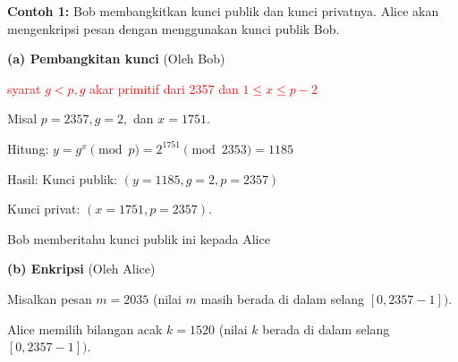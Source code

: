 \documentclass{article}
\begin{document}

\textbf{Contoh 1:} Bob membangkitkan kunci publik dan kunci privatnya. Alice akan mengenkripsi pesan dengan menggunakan kunci publik Bob.

\textbf{(a) Pembangkitan kunci} (Oleh Bob)

\textcolor{red}{syarat $g < p, g$ akar primitif dari 2357 dan $1 \le x \le p - 2$}

Misal $p = 2357, g = 2,$ dan $x = 1751$.

Hitung: $y = g^x \pmod p = 2^{1751} \pmod{2353} = 1185$

Hasil: Kunci publik: $(y = 1185, g = 2, p = 2357)$

Kunci privat: $(x = 1751, p = 2357)$.

Bob memberitahu kunci publik ini kepada Alice

\vspace{10mm}

\textbf{(b) Enkripsi} (Oleh Alice)

Misalkan pesan $m = 2035$ (nilai $m$ masih berada di dalam selang $[0, 2357 - 1])$.

Alice memilih bilangan acak $k = 1520$ (nilai $k$ berada di dalam selang $[0, 2357 - 1])$.
\end{document}
